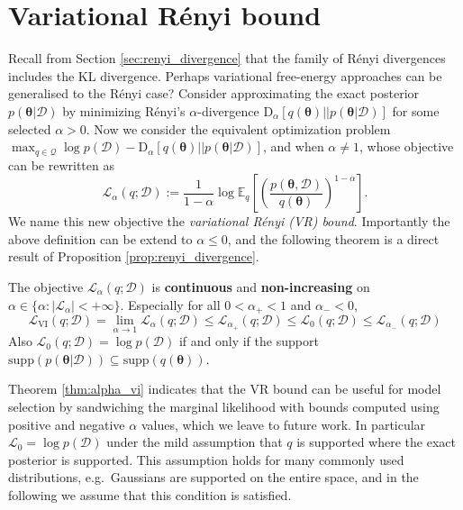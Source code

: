 \section{Variational R{\'e}nyi bound}
\label{sec:vr_bound}
Recall from Section \ref{sec:renyi_divergence} that the family of R{\'e}nyi divergences includes the KL divergence. Perhaps variational free-energy approaches can be generalised to the R{\'e}nyi case? Consider approximating the exact posterior $p(\bm{\theta}|\mathcal{D})$ by minimizing R{\'e}nyi's $\alpha$-divergence $\mathrm{D}_{\alpha}[q(\bm{\theta}) || p(\bm{\theta} | \mathcal{D})]$ for some selected $\alpha > 0$.
%
Now we consider the equivalent optimization problem $\max_{q \in \mathcal{Q}} \log p(\mathcal{D}) - \mathrm{D}_{\alpha}[q(\bm{\theta}) || p(\bm{\theta} | \mathcal{D})]$, and when $\alpha \neq 1$, whose objective can be rewritten as
\begin{equation}
\mathcal{L}_{\alpha}(q; \mathcal{D}) := \frac{1}{1 - \alpha} \log \mathbb{E}_{q} \left[ \left( \frac{p(\bm{\theta}, \mathcal{D})}{q(\bm{\theta})} \right)^{1 - \alpha} \right].
\label{eq:alpha_vi}
\end{equation}
%
We name this new objective the \emph{variational R{\'e}nyi (VR) bound}. Importantly the above definition can be extend to $\alpha \leq 0$, and the following theorem is a direct result of Proposition \ref{prop:renyi_divergence}.
\begin{theorem}
\label{thm:alpha_vi}
The objective $\mathcal{L}_{\alpha}(q; \mathcal{D})$ is \textbf{continuous} and \textbf{non-increasing} on $\alpha \in \{\alpha: |\mathcal{L}_{\alpha}| < +\infty \}$. Especially for all $0 < \alpha_{+} < 1$ and $\alpha_{-} < 0$,
\begin{equation*}
\mathcal{L}_{\text{VI}}(q; \mathcal{D}) = \lim_{\alpha \rightarrow 1} \mathcal{L}_{\alpha}(q; \mathcal{D}) 
 \leq \mathcal{L}_{\alpha_{+}}(q; \mathcal{D}) \leq \mathcal{L}_{0}(q; \mathcal{D}) \leq \mathcal{L}_{\alpha_{-}}(q; \mathcal{D})
\end{equation*}
Also $\mathcal{L}_{0}(q; \mathcal{D}) = \log p(\mathcal{D})$ if and only if the support $ \mathrm{supp}(p(\bm{\theta}|\mathcal{D})) \subseteq  \mathrm{supp}(q(\bm{\theta})) $.
\end{theorem}
%
Theorem \ref{thm:alpha_vi} indicates that the VR bound can be useful for model selection by sandwiching the marginal likelihood with bounds computed using positive and negative $\alpha$ values, which we leave to future work. In particular $\mathcal{L}_{0} = \log p(\mathcal{D})$ under the mild assumption that $q$ is supported where the exact posterior is supported. This assumption holds for many commonly used distributions, e.g.~Gaussians are supported on the entire space, and in the following we assume that this condition is satisfied. 

